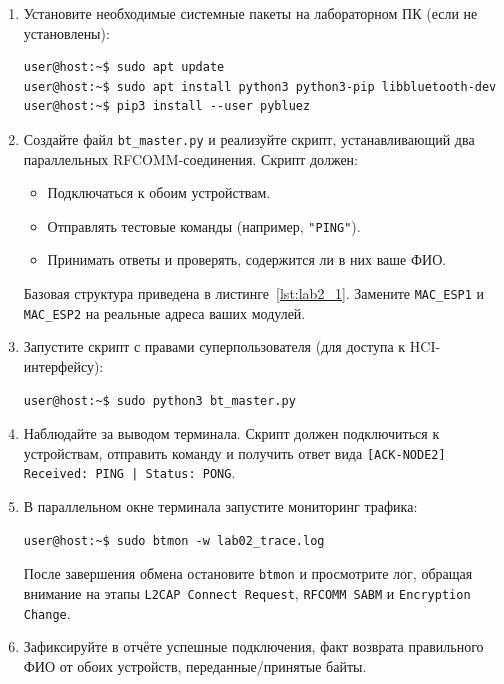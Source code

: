 \begin{enumerate}[nosep, leftmargin=*]
    \item Установите необходимые системные пакеты на лабораторном ПК (если не установлены):
    \begin{lstlisting}
user@host:~$ sudo apt update
user@host:~$ sudo apt install python3 python3-pip libbluetooth-dev
user@host:~$ pip3 install --user pybluez
    \end{lstlisting}

    \item Создайте файл \texttt{bt\_master.py} и реализуйте скрипт, устанавливающий два параллельных RFCOMM-соединения. Скрипт должен:
    \begin{itemize}
        \item Подключаться к обоим устройствам.
        \item Отправлять тестовые команды (например, \texttt{"PING"}).
        \item Принимать ответы и проверять, содержится ли в них ваше ФИО.
    \end{itemize}
    Базовая структура приведена в листинге~\ref{lst:lab2_1}. Замените \texttt{MAC\_ESP1} и \texttt{MAC\_ESP2} на реальные адреса ваших модулей.

    \item Запустите скрипт с правами суперпользователя (для доступа к HCI-интерфейсу):
    \begin{lstlisting}
user@host:~$ sudo python3 bt_master.py
    \end{lstlisting}

    \item Наблюдайте за выводом терминала. Скрипт должен подключиться к устройствам, отправить команду и получить ответ вида \texttt{[ACK-NODE2] Received: PING | Status: PONG}.

    \item В параллельном окне терминала запустите мониторинг трафика:
    \begin{lstlisting}
user@host:~$ sudo btmon -w lab02_trace.log
    \end{lstlisting}
    После завершения обмена остановите \texttt{btmon} и просмотрите лог, обращая внимание на этапы \texttt{L2CAP Connect Request}, \texttt{RFCOMM SABM} и \texttt{Encryption Change}.

    \item Зафиксируйте в отчёте успешные подключения, факт возврата правильного ФИО от обоих устройств, переданные/принятые байты.
\end{enumerate}

